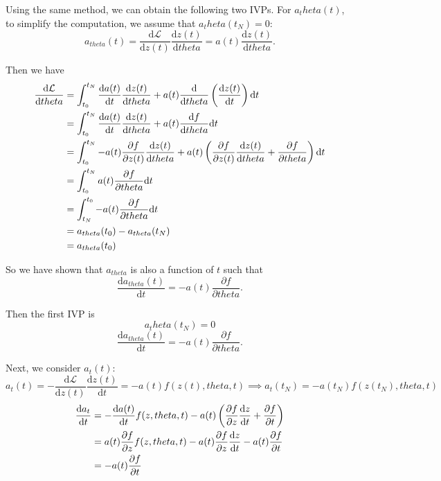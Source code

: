 \documentclass[a4paper,11pt,titlepage]{article}
\def\theta{theta}%
\theoremstyle{definition}
\theoremstyle{plain}
\theoremstyle{remark}
\begin{document}
Using the same method, we can obtain the following two IVPs. For $a_\theta(t)$, to simplify the computation, we assume that $a_\theta(t_N)=0$:
$$
a_{\theta}(t) = \frac{\mathrm{d}\mathcal{L}}{\mathrm{d}z(t)}\frac{\mathrm{d}z(t)}{\mathrm{d}\theta}=a(t)\frac{\mathrm{d}z(t)}{\mathrm{d}\theta}.
$$

Then we have
\begin{align}
\frac{\mathrm{d}\mathcal{L}}{\mathrm{d}\theta}&=\int_{t_0}^{t_N}\frac{\mathrm{d}a(t)}{\mathrm{d}t}\frac{\mathrm{d}z(t)}{\mathrm{d}\theta}+a(t)\frac{\mathrm{d}}{\mathrm{d}\theta}\left(\frac{\mathrm{d}z(t)}{\mathrm{d}t}\right)\mathrm{d}t\notag\\
&=\int_{t_0}^{t_N}\frac{\mathrm{d}a(t)}{\mathrm{d}t}\frac{\mathrm{d}z(t)}{\mathrm{d}\theta}+a(t)\frac{\mathrm{d}f}{\mathrm{d}\theta}\mathrm{d}t\notag\\
&=\int_{t_0}^{t_N}-a(t)\frac{\partial f}{\partial z(t)}\frac{\mathrm{d}z(t)}{\mathrm{d}\theta}+a(t)\left(\frac{\partial f}{\partial z(t)}\frac{\mathrm{d}z(t)}{\mathrm{d}\theta}+\frac{\partial f}{\partial \theta}\right)\mathrm{d}t\notag\\
&=\int_{t_0}^{t_N}a(t)\frac{\partial f}{\partial \theta}\mathrm{d}t\notag\\
&=\int_{t_N}^{t_0}-a(t)\frac{\partial f}{\partial \theta}\mathrm{d}t\notag\\
&=a_{\theta}(t_0)-a_{\theta}(t_N)\notag\\
&=a_{\theta}(t_0)\notag
\end{align}

So we have shown that $a_{\theta}$ is also a function of $t$ such that $$\frac{\mathrm{d}a_{\theta}(t)}{\mathrm{d}t} = -a(t)\frac{\partial f}{\partial \theta}.$$

Then the first IVP is 
$$a_\theta(t_N)=0$$
\begin{equation}\label{eq6}
    \frac{\mathrm{d}a_{\theta}(t)}{\mathrm{d}t} = -a(t)\frac{\partial f}{\partial \theta}.\tag{6}
\end{equation}

Next, we consider $a_t(t)$:
$$
a_t(t) = -\frac{\mathrm{d}\mathcal{L}}{\mathrm{d}z(t)}\frac{\mathrm{d}z(t)}{\mathrm{d}t}=-a(t)f(z(t),\theta, t)\implies a_t(t_N) = -a(t_N)f(z(t_N),\theta, t)
$$
\begin{align}
\frac{\mathrm{d}a_t}{\mathrm{d}t}&=-\frac{\mathrm{d}a(t)}{\mathrm{d}t}f(z,\theta,t)-a(t)\left(\frac{\partial f}{\partial z}\frac{\mathrm{d}z}{\mathrm{d}t}+\frac{\partial f}{\partial t}\right)\notag\\
&=a(t)\frac{\partial f}{\partial z}f(z,\theta,t)-a(t)\frac{\partial f}{\partial z}\frac{\mathrm{d}z}{\mathrm{d}t}-a(t)\frac{\partial f}{\partial t}\notag\\
&=-a(t)\frac{\partial f}{\partial t}\notag
\end{align}
\end{document}
